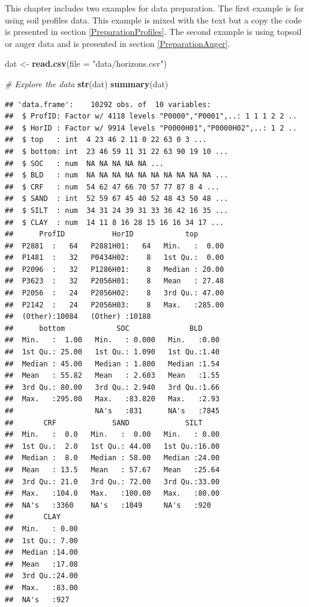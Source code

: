 \documentclass[10pt,b5paper,]{book}
\newenvironment{Shaded}{\begin{snugshade}}{\end{snugshade}}
\newcommand{\CommentTok}[1]{\textcolor[rgb]{0.56,0.35,0.01}{\textit{#1}}}
\newcommand{\DataTypeTok}[1]{\textcolor[rgb]{0.13,0.29,0.53}{#1}}
\newcommand{\KeywordTok}[1]{\textcolor[rgb]{0.13,0.29,0.53}{\textbf{#1}}}
\newcommand{\NormalTok}[1]{#1}
\newcommand{\StringTok}[1]{\textcolor[rgb]{0.31,0.60,0.02}{#1}}
\theoremstyle{definition}
\theoremstyle{definition}
\theoremstyle{definition}
\theoremstyle{remark}
\begin{document}
This chapter includes two examples for data preparation. The first
example is for using soil profiles data. This example is mixed with the
text but a copy the code is presented in section
\ref{PreparationProfiles}. The second example is using topsoil or auger
data and is presented in section \ref{PreparationAuger}.

\begin{Shaded}
\begin{Highlighting}[]
\NormalTok{dat <-}\StringTok{ }\KeywordTok{read.csv}\NormalTok{(}\DataTypeTok{file =} \StringTok{"data/horizons.csv"}\NormalTok{)}

\CommentTok{# Explore the data}
\KeywordTok{str}\NormalTok{(dat)}
\KeywordTok{summary}\NormalTok{(dat)}
\end{Highlighting}
\end{Shaded}

\begin{verbatim}
## 'data.frame':    10292 obs. of  10 variables:
##  $ ProfID: Factor w/ 4118 levels "P0000","P0001",..: 1 1 1 2 2 ..
##  $ HorID : Factor w/ 9914 levels "P0000H01","P0000H02",..: 1 2 ..
##  $ top   : int  4 23 46 2 11 0 22 63 0 3 ...
##  $ bottom: int  23 46 59 11 31 22 63 90 19 10 ...
##  $ SOC   : num  NA NA NA NA NA ...
##  $ BLD   : num  NA NA NA NA NA NA NA NA NA NA ...
##  $ CRF   : num  54 62 47 66 70 57 77 87 8 4 ...
##  $ SAND  : int  52 59 67 45 40 52 48 43 50 48 ...
##  $ SILT  : num  34 31 24 39 31 33 36 42 16 35 ...
##  $ CLAY  : num  14 11 8 16 28 15 16 16 34 17 ...
##      ProfID           HorID            top        
##  P2881  :   64   P2881H01:   64   Min.   :  0.00  
##  P1481  :   32   P0434H02:    8   1st Qu.:  0.00  
##  P2096  :   32   P1286H01:    8   Median : 20.00  
##  P3623  :   32   P2056H01:    8   Mean   : 27.48  
##  P2056  :   24   P2056H02:    8   3rd Qu.: 47.00  
##  P2142  :   24   P2056H03:    8   Max.   :285.00  
##  (Other):10084   (Other) :10188                   
##      bottom            SOC              BLD      
##  Min.   :  1.00   Min.   : 0.000   Min.   :0.00  
##  1st Qu.: 25.00   1st Qu.: 1.090   1st Qu.:1.40  
##  Median : 45.00   Median : 1.800   Median :1.54  
##  Mean   : 55.82   Mean   : 2.603   Mean   :1.55  
##  3rd Qu.: 80.00   3rd Qu.: 2.940   3rd Qu.:1.66  
##  Max.   :295.00   Max.   :83.820   Max.   :2.93  
##                   NA's   :831      NA's   :7845  
##       CRF             SAND             SILT      
##  Min.   :  0.0   Min.   :  0.00   Min.   : 0.00  
##  1st Qu.:  2.0   1st Qu.: 44.00   1st Qu.:16.00  
##  Median :  8.0   Median : 58.00   Median :24.00  
##  Mean   : 13.5   Mean   : 57.67   Mean   :25.64  
##  3rd Qu.: 21.0   3rd Qu.: 72.00   3rd Qu.:33.00  
##  Max.   :104.0   Max.   :100.00   Max.   :80.00  
##  NA's   :3360    NA's   :1049     NA's   :920    
##       CLAY      
##  Min.   : 0.00  
##  1st Qu.: 7.00  
##  Median :14.00  
##  Mean   :17.08  
##  3rd Qu.:24.00  
##  Max.   :83.00  
##  NA's   :927
\end{verbatim}
\end{document}
